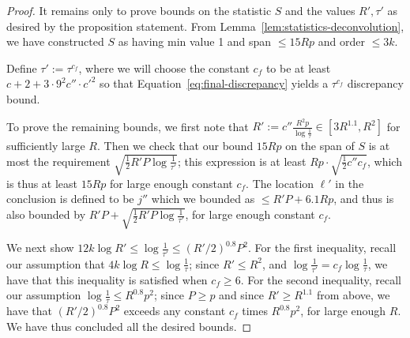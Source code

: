 \documentclass[10pt,a4paper]{amsart}
\begin{document}
\begin{proof}
It remains only to prove bounds on the statistic $S$ and the values $R',\tau'$ as desired by the proposition statement. From Lemma~\ref{lem:statistics-deconvolution}, we have constructed $S$ as having min value 1 and span $\leq 15Rp$ and order $\leq 3k$.



Define $\tau':=\tau^{c_f}$, where we will choose the constant $c_f$ to be at least $c+2+3\cdot 9^2c''\cdot {c'}^2$ so that Equation~\ref{eq:final-discrepancy} yields a $\tau^{c_f}$ discrepancy bound.

To prove the remaining bounds, we first note that $R':=c''\frac{R^2 p}{\log\frac{1}{\tau}}\in [3R^{1.1},R^2]$ for sufficiently large $R$. Then we check that our bound $15Rp$ on the span of $S$ is at most the requirement $ \sqrt{\frac{1}{2}R'P\log\frac{1}{\tau'}}$; this expression is at least $Rp \cdot  \sqrt{\frac{1}{2}c'' c_f}$, which is thus at least $15Rp$ for large enough constant $c_f$. The location $\ell'$ in the conclusion is defined to be $j''$ which we bounded as $\leq R'P+6.1Rp$, and thus is also bounded by $R'P+ \sqrt{\frac{1}{2}R'P\log\frac{1}{\tau'}}$, for large enough constant $c_f$.

We next show $12k\log R'\leq \log\frac{1}{\tau'}\leq ({R'}/2)^{0.8}P^2$. For the first inequality, recall our assumption that $4k\log R\leq \log\frac{1}{\tau}$; since $R'\leq R^2$, and $\log\frac{1}{\tau'}=c_f\log\frac{1}{\tau}$, we have that this inequality is satisfied when $c_f\geq 6$. For the second inequality, recall our assumption $\log\frac{1}{\tau}\leq {R}^{0.8}p^2$; since $P\geq p$ and since $R'\geq R^{1.1}$ from above, we have that $({R'}/2)^{0.8}P^2$ exceeds any constant $c_f$ times ${R}^{0.8}p^2$, for large enough $R$. We have thus concluded all the desired bounds.
\end{proof}
\end{document}

